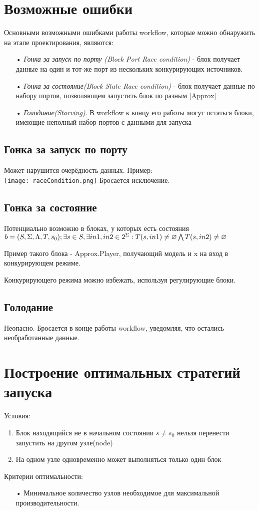 \documentclass[a4paper,14pt]{article}
\begin{document}
\newpage
\section{Возможные ошибки}
Основными возможными ошибками работы workflow, которые можно обнаружить на этапе проектирования, являются:
\begin{enumerate}
\item[•] \textit{Гонка за запуск по порту (Block Port Race condition)} - блок получает данные на один и тот-же порт  из нескольких конкурирующих источников.
\item[•] \textit{Гонка за состояние(Block State Race condition)} - блок получает данные по набору портов, позволяющем запустить блок по разным [Approx]
\item[•] \textit{Голодание(Starving)}. В workflow к концу его работы могут остаться блоки, имеющие неполный набор портов с данными для запуска
\end{enumerate}
\newpage
\subsection{Гонка за запуск по порту}
Может нарушится очерёдность данных.
Пример:\\
\texttt{[image: raceCondition.png]}
Бросается исключение. 
\newpage
\subsection{Гонка за состояние}
Потенциально возможно в блоках, у которых есть состояния
$b = (S, \Sigma,\Lambda, T, s_{0});\\
 \exists s \in S , \exists in1, in2 \in 2^{\Sigma} :  T(s, in1) \neq \varnothing \bigwedge T(s, in2) \neq \varnothing$

Пример такого блока  - Approx.Player, получающий модель и x на вход в конкурирующем режиме.

Конкурирующего режима можно избежать, используя регулирующие блоки.


\subsection{Голодание}
Неопасно. Бросается в конце работы workflow, уведомляя, что остались необработанные данные.

\newpage
\section{Построение оптимальных стратегий запуска}
Условия:
\begin{enumerate}
\item Блок находящийся не в  начальном состоянии $s \neq s_{0}$ нельзя перенести запустить на другом узле(node)
\item На одном узле одновременно может выполняться только один блок
\end{enumerate}
Критерии оптимальности:
\begin{enumerate}
\item[•] Минимальное количество узлов необходимое для максимальной производительности.
\end{enumerate}
\end{document}
